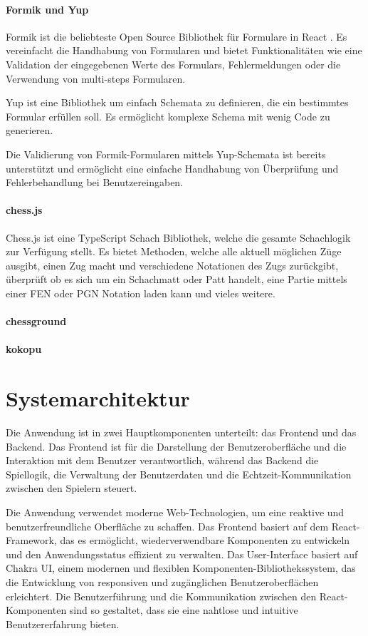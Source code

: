 \documentclass[a4paper,12pt]{report}
\newcommand{\footcite}[1]{\footnotemark\footnotetext{\cite{#1}}}
\begin{document}
        \subsubsection{Formik und Yup}
Formik ist die beliebteste Open Source Bibliothek für Formulare in React \footcite{formik}. Es vereinfacht die Handhabung von Formularen und bietet Funktionalitäten wie eine Validation der eingegebenen Werte des Formulars, Fehlermeldungen oder die Verwendung von multi-steps Formularen.

Yup ist eine Bibliothek um einfach Schemata zu definieren, die ein bestimmtes Formular erfüllen soll. Es ermöglicht komplexe Schema mit wenig Code zu generieren\footcite{Yup}.

Die Validierung von Formik-Formularen mittels Yup-Schemata ist bereits unterstützt und ermöglicht eine einfache Handhabung von Überprüfung und Fehlerbehandlung bei Benutzereingaben.
        \subsubsection{chess.js}
Chess.js ist eine TypeScript Schach Bibliothek, welche die gesamte Schachlogik zur Verfügung stellt. Es bietet Methoden, welche alle aktuell möglichen Züge ausgibt, einen Zug macht und verschiedene Notationen des Zugs zurückgibt, überprüft ob es sich um ein Schachmatt oder Patt handelt, eine Partie mittels einer FEN\footcite{FEN} oder PGN\footcite{PGN} Notation laden kann und vieles weitere. 
        \subsubsection{chessground}
        
        \subsubsection{kokopu}
        
        
\chapter{Systemarchitektur}
Die Anwendung ist in zwei Hauptkomponenten unterteilt: das Frontend und das Backend. Das Frontend ist für die Darstellung der Benutzeroberfläche und die Interaktion mit dem Benutzer verantwortlich, während das Backend die Spiellogik, die Verwaltung der Benutzerdaten und die Echtzeit-Kommunikation zwischen den Spielern steuert.

Die Anwendung verwendet moderne Web-Technologien, um eine reaktive und benutzerfreundliche Oberfläche zu schaffen. Das Frontend basiert auf dem React-Framework\footcite{react}, das es ermöglicht, wiederverwendbare Komponenten zu entwickeln und den Anwendungsstatus effizient zu verwalten. Das User-Interface basiert auf Chakra UI\footcite{chakraui}, einem modernen und flexiblen Komponenten-Bibliothekssystem, das die Entwicklung von responsiven und zugänglichen Benutzeroberflächen erleichtert. Die Benutzerführung und die Kommunikation zwischen den React-Komponenten sind so gestaltet, dass sie eine nahtlose und intuitive Benutzererfahrung bieten.
\end{document}

